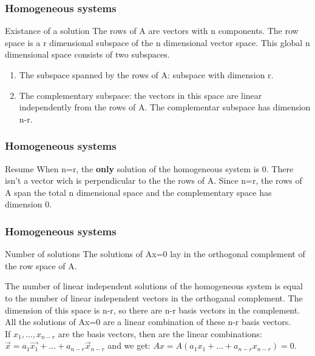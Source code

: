 \begin{frame}
	\frametitle{Homogeneous systems}
	\begin{block}{Existance of a solution}
		The rows of A are vectors with n components. The row space is a r dimensional subspace of the n dimensional vector space. This global n dimensional space consists of two subspaces. 
		\begin{enumerate}
			\item The subspace spanned by the rows of A: subspace with dimension r. 
			\item The complementary subspace: the vectors in this space are linear independently from the rows of A. The complementar subspace has dimension n-r. 
		\end{enumerate} 
	\end{block}
\end{frame}

\begin{frame}
	\frametitle{Homogeneous systems}
	\begin{block}{Resume}
		When n=r, the \textbf{only} solution of the homogeneous system is 0. There isn't a vector wich is perpendicular to the the rows of A. Since n=r, the rows of A span the total n dimensional space and the complementary space has dimension 0.\vspace{4mm}
	\end{block}
\end{frame}

\begin{frame}
	\frametitle{Homogeneous systems}
	\begin{block}{Number of solutions}
		The solutions of Ax=0 lay in the orthogonal complement of the row space of A. \vspace{4mm}
		
		The number of linear independent solutions of the homogeneous system is equal to the number of linear independent vectors in the orthoganal complement. The dimension of this space is n-r, so there are n-r basis vectors in the complement. All the solutions of Ax=0 are a linear combination of these n-r basis vectors.\\
		If $x_1,...,x_{n-r}$ are the basis vectors, then are the linear combinations: $\overrightarrow{x}=a_1\overrightarrow{x_1}+...+a_{n-r}\overrightarrow{x}_{n-r}$ and we get: $Ax=A(a_1x_1+...+a_{n-r}x_{n-r})=0$.
	\end{block}
\end{frame}

